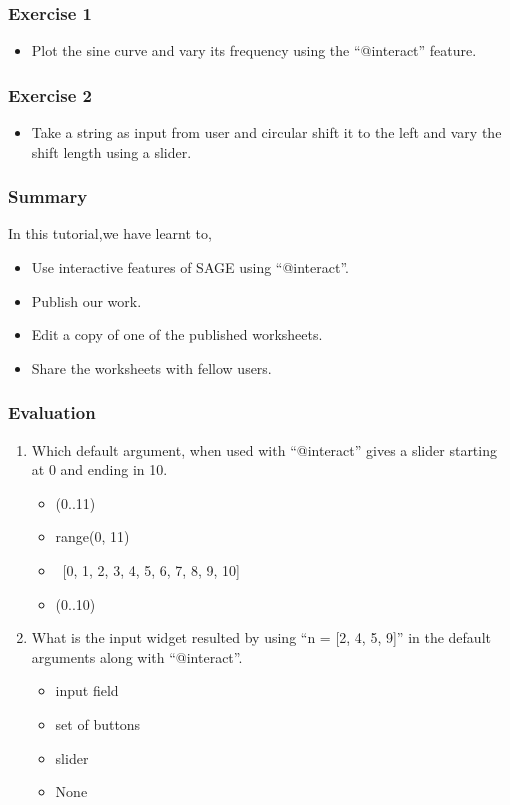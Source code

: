 \documentclass[presentation]{beamer}
\begin{document}
\begin{frame}
\frametitle{Exercise 1}
\label{sec-4}


\begin{itemize}
\item Plot the sine curve and vary its frequency using the ``@interact'' feature.
\end{itemize}
\end{frame}
\begin{frame}
\frametitle{Exercise 2}
\label{sec-5}


\begin{itemize}
\item Take a string as input from user and circular shift it to the left and
  vary the shift length using a slider.
\end{itemize}
\end{frame}
\begin{frame}
\frametitle{Summary}
\label{sec-6}

  In this tutorial,we have learnt to,


\begin{itemize}
\item Use interactive features of SAGE using ``@interact''.
\item Publish our work.
\item Edit a copy of one of the published worksheets.
\item Share the worksheets with fellow users.
\end{itemize}
\end{frame}
\begin{frame}
\frametitle{Evaluation}
\label{sec-7}


\begin{enumerate}
\item Which default argument, when used with ``@interact'' gives a slider 
    starting at 0 and ending in 10.
\begin{itemize}
\item (0..11)
\item range(0, 11)
\item~[0, 1, 2, 3, 4, 5, 6, 7, 8, 9, 10]~
\item (0..10)
\end{itemize}
\vspace{5pt}
\item What is the input widget resulted by using ``n = [2, 4, 5, 9]'' in the
    default arguments along with ``@interact''.
\begin{itemize}
\item input field
\item set of buttons
\item slider
\item None
\end{itemize}
\end{enumerate}
\end{frame}
\end{document}

